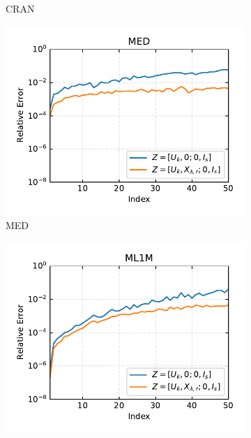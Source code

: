 \begin{figure}[h]
\begin{subfigure}[b]{0.3\textwidth}
        \caption{CRAN}
        \label{fig:single_cran_rel_err}
    \end{subfigure}
    \begin{subfigure}[b]{0.3\textwidth}
        \centering
        \includegraphics[width=\textwidth]{figures/single/med/relative_errors_MED_batch_split_1.pdf}
        \caption{MED}
        \label{fig:single_med_rel_err}
    \end{subfigure}
    \begin{subfigure}[b]{0.3\textwidth}
        \centering
        \includegraphics[width=\textwidth]{figures/single/ml1m/relative_errors_ML1M_batch_split_1.pdf}

\end{subfigure}
\end{figure}
